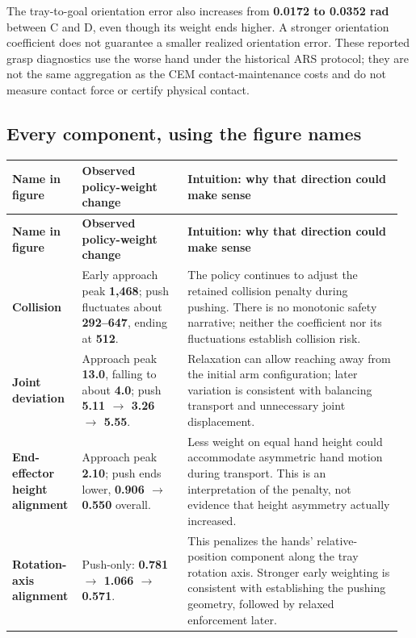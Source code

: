 \documentclass[11pt,a4paper]{article}
\begin{document}
The tray-to-goal orientation error also increases from \textbf{0.0172 to 0.0352 rad} between C and D, even though its weight ends higher. A stronger orientation coefficient does not guarantee a smaller realized orientation error. These reported grasp diagnostics use the worse hand under the historical ARS protocol; they are not the same aggregation as the CEM contact-maintenance costs and do not measure contact force or certify physical contact.

\subsection{Every component, using the figure names}

\begingroup\small\setlength{\tabcolsep}{4pt}\renewcommand{\arraystretch}{1.2}
\begin{longtable}{@{}p{0.17\linewidth}p{0.26\linewidth}p{0.53\linewidth}@{}}
\toprule
\textbf{Name in figure} & \textbf{Observed policy-weight change} & \textbf{Intuition: why that direction could make sense} \\
\midrule
\endfirsthead
\toprule
\textbf{Name in figure} & \textbf{Observed policy-weight change} & \textbf{Intuition: why that direction could make sense} \\
\midrule
\endhead
\bottomrule
\endfoot
\textbf{Collision} & Early approach peak \textbf{1,468}; push fluctuates about \textbf{292--647}, ending at \textbf{512}. & The policy continues to adjust the retained collision penalty during pushing. There is no monotonic safety narrative; neither the coefficient nor its fluctuations establish collision risk. \\
\textbf{Joint deviation} & Approach peak \textbf{13.0}, falling to about \textbf{4.0}; push \textbf{5.11 \(\rightarrow\) 3.26 \(\rightarrow\) 5.55}. & Relaxation can allow reaching away from the initial arm configuration; later variation is consistent with balancing transport and unnecessary joint displacement. \\
\textbf{End-effector height alignment} & Approach peak \textbf{2.10}; push ends lower, \textbf{0.906 \(\rightarrow\) 0.550} overall. & Less weight on equal hand height could accommodate asymmetric hand motion during transport. This is an interpretation of the penalty, not evidence that height asymmetry actually increased. \\
\textbf{Rotation-axis alignment} & Push-only: \textbf{0.781 \(\rightarrow\) 1.066 \(\rightarrow\) 0.571}. & This penalizes the hands' relative-position component along the tray rotation axis. Stronger early weighting is consistent with establishing the pushing geometry, followed by relaxed enforcement later. \\

\end{longtable}
\end{document}
